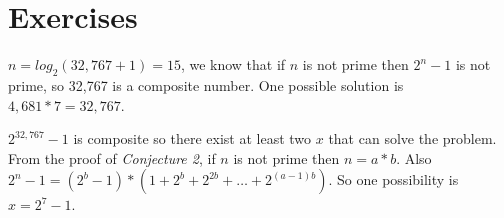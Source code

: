 \section{Exercises}


\sol $n = log_2(32,767+1) = 15$, we know that if $n$ is not prime then $2^n - 1$ is not prime, so 32,767 is a composite number. 
One possible solution is $4,681 * 7 = 32,767$.


\sol $2^{32,767} - 1$ is composite so there exist at least two $x$ that can solve the problem.
From the proof of \textit{Conjecture 2}, if $n$ is not prime then $n = a*b$.
Also $2^n - 1 = (2^b - 1) * (1 + 2^b + 2^{2b} + \ldots + 2^{(a-1)b})$.
So one possibility is $x = 2^7 - 1$.

